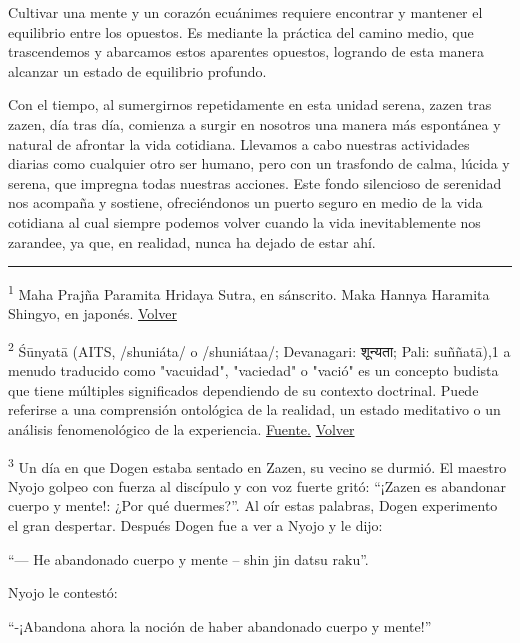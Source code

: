 \documentclass[
  a5paperpaper,
]{article}
\begin{document}
Cultivar una mente y un corazón ecuánimes requiere encontrar y mantener
el equilibrio entre los opuestos. Es mediante la práctica del camino
medio, que trascendemos y abarcamos estos aparentes opuestos, logrando
de esta manera alcanzar un estado de equilibrio profundo.

Con el tiempo, al sumergirnos repetidamente en esta unidad serena, zazen
tras zazen, día tras día, comienza a surgir en nosotros una manera más
espontánea y natural de afrontar la vida cotidiana. Llevamos a cabo
nuestras actividades diarias como cualquier otro ser humano, pero con un
trasfondo de calma, lúcida y serena, que impregna todas nuestras
acciones. Este fondo silencioso de serenidad nos acompaña y sostiene,
ofreciéndonos un puerto seguro en medio de la vida cotidiana al cual
siempre podemos volver cuando la vida inevitablemente nos zarandee, ya
que, en realidad, nunca ha dejado de estar ahí.

\hfill\break

\begin{center}\rule{0.5\linewidth}{0.5pt}\end{center}

\leavevmode{}%
\textsuperscript{1} Maha Prajña Paramita Hridaya Sutra, en sánscrito.
Maka Hannya Haramita Shingyo, en japonés.
\protect\hyperlink{ref1}{Volver}

\textsuperscript{2} Śūnyatā (AITS, /shuniáta/ o /shuniátaa/; Devanagari:
शून्यता; Pali: suññatā),1\hspace{0pt} a menudo traducido como
"vacuidad", "vaciedad" o "vació" es un concepto budista que tiene
múltiples significados dependiendo de su contexto doctrinal. Puede
referirse a una comprensión ontológica de la realidad, un estado
meditativo o un análisis fenomenológico de la experiencia.
\href{https://es.wikipedia.org/wiki/Shuniata}{Fuente.}
\protect\hyperlink{ref2}{Volver}

\textsuperscript{3} Un día en que Dogen estaba sentado en Zazen, su
vecino se durmió. El maestro Nyojo golpeo con fuerza al discípulo y con
voz fuerte gritó: ``¡Zazen es abandonar cuerpo y mente!: ¿Por qué
duermes?''. Al oír estas palabras, Dogen experimento el gran despertar.
Después Dogen fue a ver a Nyojo y le dijo:

``--- He abandonado cuerpo y mente -- shin jin datsu raku''.

Nyojo le contestó:

``-¡Abandona ahora la noción de haber abandonado cuerpo y mente!''
\end{document}
